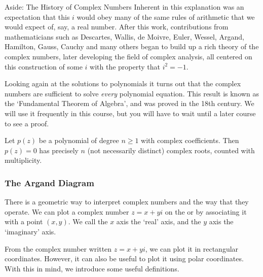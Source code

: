 \begin{aside}{Aside: The History of Complex Numbers}
Inherent in this explanation was an expectation that this $i$ would obey many of the same rules of arithmetic that we would expect of, say, a real number. After this work, contributions from mathematicians such as Descartes, Wallis, de Moivre, Euler, Wessel, Argand, Hamilton, Gauss, Cauchy and many others began to build up a rich theory of the complex numbers, later developing the field of complex analysis, all centered on this construction of some $i$ with the property that $i^2 = -1$. 

\end{aside}

Looking again at the solutions to polynomials it turns out that the complex numbers are sufficient to solve \emph{every} polynomial equation. This result is known as the `Fundamental Theorem of Algebra', and was proved in the 18th century. We will use it frequently in this course, but you will have to wait until a later course to see a proof.
\begin{theorem}
Let $p(z)$ be a polynomial of degree $n \geq 1$ with complex coefficients. Then $p(z) = 0$ has precisely $n$ (not necessarily distinct) complex roots, counted with multiplicity. 
\end{theorem}

\subsubsection{The Argand Diagram}

There is a geometric way to interpret complex numbers and the way that they operate. We can plot a complex number $z = x + yi$ on the  or  by associating it with a point $(x, y)$. We call the $x$ axis the `real' axis, and the $y$ axis the `imaginary' axis.

\begin{center}
\end{center}

From the complex number written $z= x + yi$, we can plot it in rectangular coordinates. However, it can also be useful to plot it using polar coordinates. With this in mind, we introduce some useful 
definitions.

